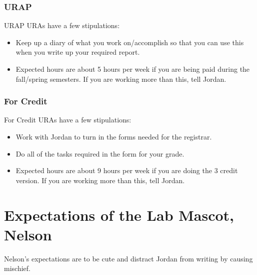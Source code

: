 \documentclass[
]{book}
\begin{document}
\hypertarget{urap}{%
\subsubsection{URAP}\label{urap}}

URAP URAs have a few stipulations:

\begin{itemize}
\item
  Keep up a diary of what you work on/accomplish so that you can use this when you write up your required report.
\item
  Expected hours are about 5 hours per week if you are being paid during the fall/spring semesters. If you are working more than this, tell Jordan.
\end{itemize}

\hypertarget{for-credit}{%
\subsubsection{For Credit}\label{for-credit}}

For Credit URAs have a few stipulations:

\begin{itemize}
\item
  Work with Jordan to turn in the forms needed for the registrar.
\item
  Do all of the tasks required in the form for your grade.
\item
  Expected hours are about 9 hours per week if you are doing the 3 credit version. If you are working more than this, tell Jordan.
\end{itemize}

\hypertarget{expectations-of-the-lab-mascot-nelson}{%
\section{Expectations of the Lab Mascot, Nelson}\label{expectations-of-the-lab-mascot-nelson}}

Nelson's expectations are to be cute and distract Jordan from writing by causing mischief.
\end{document}
